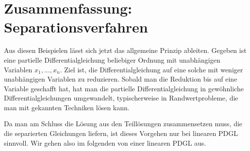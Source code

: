 %
%
%
\section{Zusammenfassung: Separationsverfahren}
Aus diesen Beispielen lässt sich jetzt das allgemeine Prinzip 
ableiten. Gegeben ist eine partielle Differentialgleichung
beliebiger Ordnung mit unabhängigen Variablen $x_1,\dots,x_n$.
Ziel ist, die Differentialgleichung auf eine solche mit weniger
unabhängigen Variablen zu reduzieren. Sobald man die Reduktion
bis auf eine Variable geschafft hat, hat man die partielle
Differentialgleichung in gewöhnliche Differentialgleichungen
umgewandelt, typischerweise in Randwertprobleme,
die man mit gekannten Techniken lösen kann.

Da man am Schluss die Lösung aus den Teillösungen zusammensetzen
muss, die die separierten Gleichungen liefern, ist dieses Vorgehen
nur bei linearen PDGL sinnvoll. Wir gehen also im folgenden von
einer linearen PDGL aus.

